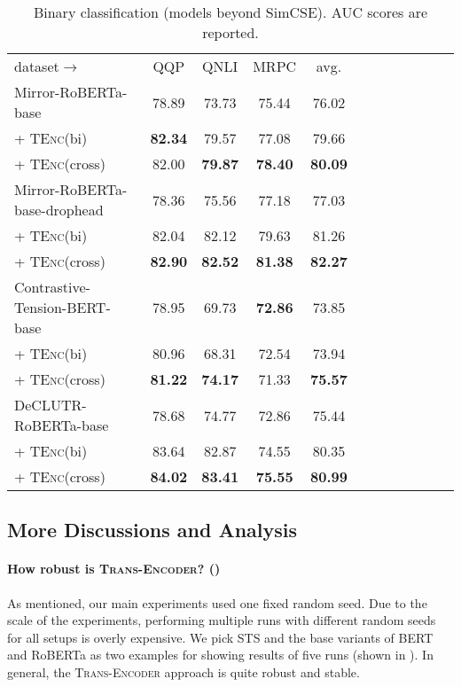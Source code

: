 \documentclass{article} \usepackage{iclr2021_conference,times}
\newcommand{\modelname}{\textsc{Trans-Encoder}\xspace}
\newcommand{\tenc}{\textsc{TEnc}\xspace}
\begin{document}
\begin{table}[!t] \centering
\small
\begin{tabular}{lccccccccccc}
\cmidrule[1.5pt]{1-10}
dataset$\rightarrow$  & QQP & QNLI & MRPC & avg.\\
\cmidrule[1.5pt]{1-10}
 Mirror-RoBERTa-base & 78.89 & 73.73 & 75.44 & 76.02 \\
 + \tenc (bi) & \textbf{82.34} & 79.57 & 77.08 & 79.66 \\
 + \tenc (cross) & 82.00 & \textbf{79.87} & \textbf{78.40} & \textbf{80.09} \\
\cmidrule[1.0pt]{1-10}
 Mirror-RoBERTa-base-drophead & 78.36 & 75.56 & 77.18 & 77.03 \\
 + \tenc (bi) & 82.04 & 82.12 & 79.63 & 81.26 \\
 + \tenc (cross) & \textbf{82.90} & \textbf{82.52} & \textbf{81.38} & \textbf{82.27} \\
 \cmidrule[1.0pt]{1-10}
Contrastive-Tension-BERT-base & 78.95 & 69.73 & \textbf{72.86} & 73.85  \\
 + \tenc (bi) & 80.96 & 68.31 & 72.54 & 73.94 \\
 + \tenc (cross) & \textbf{81.22} & \textbf{74.17} & 71.33 & \textbf{75.57}  \\
\cmidrule[1.0pt]{1-10}
DeCLUTR-RoBERTa-base  & 78.68 & 74.77 & 72.86 & 75.44 \\
 + \tenc (bi) & 83.64 & 82.87 & 74.55 & 80.35 \\
 + \tenc (cross) & \textbf{84.02} & \textbf{83.41} & \textbf{75.55} & \textbf{80.99} \\
\cmidrule[1.5pt]{1-10}
\end{tabular}
\caption{Binary classification  (models beyond SimCSE). AUC scores are reported.}
\label{tab:binary_classification_mirrorbert}
\end{table}




\subsection{More Discussions and Analysis}\label{sec:more_discuss}


\paragraph{How robust is \modelname? ()} As mentioned, our main experiments used one fixed random seed. Due to the scale of the experiments, performing multiple runs with different random seeds for all setups is overly expensive. We pick STS and the base variants of BERT and RoBERTa as two examples for showing results of five runs (shown in ). In general, the \modelname approach is quite robust and stable.
\end{document}
